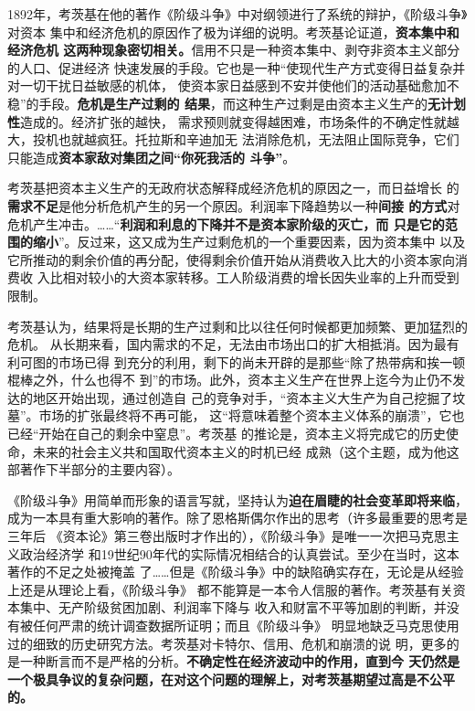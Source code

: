 1892年，考茨基在他的著作《阶级斗争》中对纲领进行了系统的辩护，《阶级斗争》对资本
集中和经济危机的原因作了极为详细的说明。考茨基论证道，\textbf{资本集中和经济危机
  这两种现象密切相关。}信用不只是一种资本集中、剥夺非资本主义部分的人口、促进经济
快速发展的手段。它也是一种“使现代生产方式变得日益复杂并对一切干扰日益敏感的机体，
使资本家日益感到不安并使他们的活动基础愈加不稳”的手段。\textbf{危机是生产过剩的
  结果}，而这种生产过剩是由资本主义生产的\textbf{无计划性}造成的。经济扩张的越快，
需求预则就变得越困难，市场条件的不确定性就越大，投机也就越疯狂。托拉斯和辛迪加无
法消除危机，无法阻止国际竞争，它们只能造成\textbf{资本家敌对集团之间“你死我活的
  斗争”}。

考茨基把资本主义生产的无政府状态解释成经济危机的原因之一，而日益增长
的\textbf{需求不足}是他分析危机产生的另一个原因。利润率下降趋势以一种\textbf{间接
  的方式}对危机产生冲击。……“\textbf{利润和利息的下降并不是资本家阶级的灭亡，而
  只是它的范围的缩小}”。反过来，这又成为生产过剩危机的一个重要因素，因为资本集中
以及它所推动的剩余价值的再分配，使得剩余价值开始从消费收入比大的小资本家向消费收
入比相对较小的大资本家转移。工人阶级消费的增长因失业率的上升而受到限制。

考茨基认为，结果将是长期的生产过剩和比以往任何时候都更加频繁、更加猛烈的危机。
从长期来看，国内需求的不足，无法由市场出口的扩大相抵消。因为最有利可图的市场已得
到充分的利用，剩下的尚未开辟的是那些“除了热带病和挨一顿棍棒之外，什么也得不
到”的市场。此外，资本主义生产在世界上迄今为止仍不发达的地区开始出现，通过创造自
己的竞争对手，“资本主义大生产为自己挖掘了坟墓”。市场的扩张最终将不再可能，
这“将意味着整个资本主义体系的崩溃”，它也已经“开始在自己的剩余中窒息”。考茨基
的推论是，资本主义将完成它的历史使命，未来的社会主义共和国取代资本主义的时机已经
成熟（这个主题，成为他这部著作下半部分的主要内容）。

《阶级斗争》用简单而形象的语言写就，坚持认为\textbf{迫在眉睫的社会变革即将来临}，
成为一本具有重大影响的著作。除了恩格斯偶尔作出的思考（许多最重要的思考是三年后
《资本论》第三卷出版时才作出的），《阶级斗争》是唯一一次把马克思主义政治经济学
和19世纪90年代的实际情况相结合的认真尝试。至少在当时，这本著作的不足之处被掩盖
了……但是《阶级斗争》中的缺陷确实存在，无论是从经验上还是从理论上看，《阶级斗争》
都不能算是一本令人信服的著作。考茨基有关资本集中、无产阶级贫困加剧、利润率下降与
收入和财富不平等加剧的判断，并没有被任何严肃的统计调查数据所证明；而且《阶级斗争》
明显地缺乏马克思使用过的细致的历史研究方法。考茨基对卡特尔、信用、危机和崩溃的说
明，更多的是一种断言而不是严格的分析。\textbf{不确定性在经济波动中的作用，直到今
  天仍然是一个极具争议的复杂问题，在对这个问题的理解上，对考茨基期望过高是不公平
  的。}

